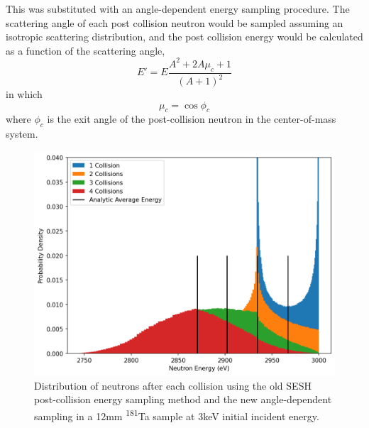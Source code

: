     This was substituted with an angle-dependent energy sampling procedure. The scattering angle of each post collision neutron would be sampled assuming an isotropic scattering distribution, and the post collision energy would be calculated as a function of the scattering angle,
    \begin{equation}
        E' = E \frac{A^2 + 2 A \mu_c + 1}{\left( A + 1 \right)^2}
    \end{equation}
    in which
    \begin{equation}
        \mu_c = \cos\phi_c
    \end{equation}
    where $\phi_c$ is the exit angle of the post-collision neutron in the center-of-mass system.
    \begin{figure}
        \centering
        \includegraphics[width=0.95\linewidth]{Implementation/Figures/multiple_scattering.png}
        \caption{Distribution of neutrons after each collision using the old SESH post-collision energy sampling method and the new angle-dependent sampling in a 12mm \textsuperscript{181}Ta sample at 3keV initial incident energy.}
        \label{fig:multiple-scattering}
    \end{figure}